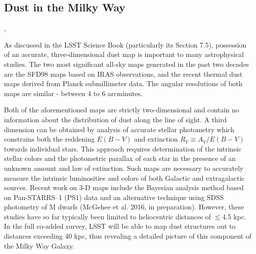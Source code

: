 %
%


\subsection{Dust in the Milky Way}

,

As discussed in the LSST Science Book (particularly its Section 7.5),
possession of an accurate, three-dimensional dust map is important to
many astrophysical studies. The two most significant all-sky maps
generated in the past two decades are the SFD98 maps based on IRAS
observations, and the recent thermal dust maps derived from Planck
submillimeter data. The angular resolutions of both maps are similar -
between 4 to 6 arcminutes.

Both of the aforementioned maps are strictly two-dimensional and contain
no information about the distribution of dust along the line of sight. A
third dimension can be obtained by analysis of accurate stellar
photometry which constrains both the reddening $E(B-V)$ and extinction
$R_V \equiv A_V/E(B-V)$ towards individual stars. This approach requires
determination of the intrinsic stellar colors and the photometric
parallax of each star in the presence of an unknown amount and law of
extinction. Such maps are necessary to accurately measure the intrinsic
luminosities and colors of both Galactic and extragalactic sources.
Recent work on 3-D maps include the Bayesian analysis method based on
Pan-STARRS--1 (PS1) data \citep{green15} and an alternative technique
using SDSS photometry of M dwarfs (McGehee et al. 2016, in preparation).
However, these studies have so far typically been limited to
heliocentric distances of $\lesssim$4.5 kpc. In the full co-added
survey, LSST will be able to map dust structures out to distances
exceeding 40 kpc, thus revealing a detailed picture of this component of
the Milky Way Galaxy.

